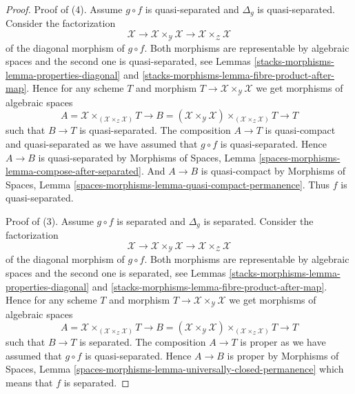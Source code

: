 \begin{proof}
\medskip\noindent
Proof of (4). Assume $g \circ f$ is quasi-separated and $\Delta_g$ is
quasi-separated. Consider the factorization
$$
\mathcal{X} \to
\mathcal{X} \times_\mathcal{Y} \mathcal{X} \to
\mathcal{X} \times_\mathcal{Z} \mathcal{X}
$$
of the diagonal morphism of $g \circ f$. Both morphisms are
representable by algebraic spaces and the second one is quasi-separated, see
Lemmas \ref{stacks-morphisms-lemma-properties-diagonal} and
\ref{stacks-morphisms-lemma-fibre-product-after-map}.
Hence for any scheme $T$ and morphism
$T \to \mathcal{X} \times_\mathcal{Y} \mathcal{X}$
we get morphisms of algebraic spaces
$$
A = \mathcal{X} \times_{(\mathcal{X} \times_\mathcal{Z} \mathcal{X})} T
\longrightarrow
B = (\mathcal{X} \times_\mathcal{Y} \mathcal{X})
\times_{(\mathcal{X} \times_\mathcal{Z} \mathcal{X})} T
\longrightarrow
T
$$
such that $B \to T$ is quasi-separated.
The composition $A \to T$ is quasi-compact and quasi-separated
as we have assumed that $g \circ f$ is quasi-separated.
Hence $A \to B$ is quasi-separated by
Morphisms of Spaces,
Lemma \ref{spaces-morphisms-lemma-compose-after-separated}.
And $A \to B$ is quasi-compact by
Morphisms of Spaces,
Lemma \ref{spaces-morphisms-lemma-quasi-compact-permanence}.
Thus $f$ is quasi-separated.

\medskip\noindent
Proof of (3). Assume $g \circ f$ is separated and $\Delta_g$ is
separated. Consider the factorization
$$
\mathcal{X} \to
\mathcal{X} \times_\mathcal{Y} \mathcal{X} \to
\mathcal{X} \times_\mathcal{Z} \mathcal{X}
$$
of the diagonal morphism of $g \circ f$. Both morphisms are
representable by algebraic spaces and the second one is separated, see
Lemmas \ref{stacks-morphisms-lemma-properties-diagonal} and
\ref{stacks-morphisms-lemma-fibre-product-after-map}.
Hence for any scheme $T$ and morphism
$T \to \mathcal{X} \times_\mathcal{Y} \mathcal{X}$
we get morphisms of algebraic spaces
$$
A = \mathcal{X} \times_{(\mathcal{X} \times_\mathcal{Z} \mathcal{X})} T
\longrightarrow
B = (\mathcal{X} \times_\mathcal{Y} \mathcal{X})
\times_{(\mathcal{X} \times_\mathcal{Z} \mathcal{X})} T
\longrightarrow
T
$$
such that $B \to T$ is separated.
The composition $A \to T$ is proper as we have assumed that
$g \circ f$ is quasi-separated. Hence $A \to B$ is proper by
Morphisms of Spaces,
Lemma \ref{spaces-morphisms-lemma-universally-closed-permanence}
which means that $f$ is separated.
\end{proof}

